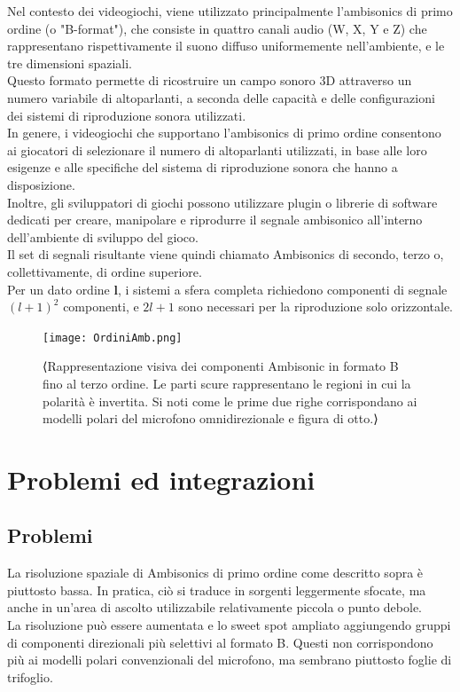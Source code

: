       Nel contesto dei videogiochi, viene utilizzato principalmente l'ambisonics di primo ordine (o "B-format"), che consiste in quattro canali audio (W, X, Y e Z) che rappresentano rispettivamente il suono diffuso uniformemente nell'ambiente, e le tre dimensioni spaziali.\\
      Questo formato permette di ricostruire un campo sonoro 3D attraverso un numero variabile di altoparlanti, a seconda delle capacità e delle configurazioni dei sistemi di riproduzione sonora utilizzati.\\
      In genere, i videogiochi che supportano l'ambisonics di primo ordine consentono ai giocatori di selezionare il numero di altoparlanti utilizzati, in base alle loro esigenze e alle specifiche del sistema di riproduzione sonora che hanno a disposizione.\\
      Inoltre, gli sviluppatori di giochi possono utilizzare plugin o librerie di software dedicati per creare, manipolare e riprodurre il segnale ambisonico all'interno dell'ambiente di sviluppo del gioco.\\
      Il set di segnali risultante viene quindi chiamato Ambisonics di secondo, terzo o, collettivamente, di ordine superiore.\\
      Per un dato ordine $\mathbf{l}$, i sistemi a sfera completa richiedono componenti di segnale $(l+1)^{2}$ componenti, e $2l+1$ sono necessari per la riproduzione solo orizzontale.
\\
      \begin{figure}[h]
            \centering
            \texttt{[image: OrdiniAmb.png]}
            \caption{⟨Rappresentazione visiva dei componenti Ambisonic in formato B fino al terzo ordine.
            Le parti scure rappresentano le regioni in cui la polarità è invertita.
            Si noti come le prime due righe corrispondano ai modelli polari del microfono omnidirezionale e figura di otto.⟩}
            \label{fig:⟨etichetta⟩}
            \end{figure}

      \section{Problemi ed integrazioni}

      \subsection{Problemi}
      La risoluzione spaziale di Ambisonics di primo ordine come descritto sopra è piuttosto bassa.
      In pratica, ciò si traduce in sorgenti leggermente sfocate, ma anche in un'area di ascolto utilizzabile relativamente piccola o punto debole.\\
      La risoluzione può essere aumentata e lo sweet spot ampliato aggiungendo gruppi di componenti direzionali più selettivi al formato B.
      Questi non corrispondono più ai modelli polari convenzionali del microfono, ma sembrano piuttosto foglie di trifoglio. 
      
